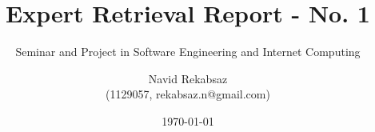 \title{Expert Retrieval Report - No. 1}
\subtitle{Seminar and Project in Software Engineering and Internet Computing \\[0.8cm] {\rmfamily\normalfont\Large}}

\author{
    Navid Rekabsaz \\ {\small (1129057, rekabsaz.n@gmail.com)}
}

\date{\today}
